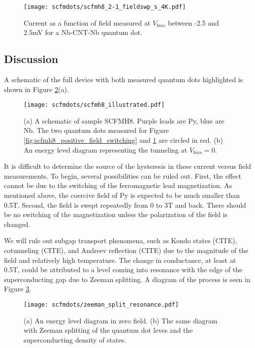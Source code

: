 \begin{figure}
    \centering
    \texttt{[image: scfmdots/scfmh8\_2-1\_fieldswp\_s\_4K.pdf]}
    \caption{Current as a function of field measured at $V_{bias}$ between -2.5 and 2.5mV for a Nb-CNT-Nb quantum dot. }
    \label{fig:scfmh8_all_superconducting}
\end{figure}

\subsection{Discussion}

A schematic of the full device with both measured quantum dots highlighted is shown in Figure \ref{fig:scfmh8_illustration}(a). 

\begin{figure}
    \centering
    \texttt{[image: scfmdots/scfmh8\_illustrated.pdf]}
    \caption{(a) A schematic of sample SCFMH8. Purple leads are Py, blue are Nb. The two quantum dots measured for Figure \ref{fig:scfmh8_positive_field_switching} and \ref{fig:scfmh8_all_superconducting} are circled in red. (b) An energy level diagram representing the tunneling at $V_{bias}=0$.}
    \label{fig:scfmh8_illustration}
\end{figure}

It is difficult to determine the source of the hysteresis in these current versus field measurements. To begin, several possibilities can be ruled out. First, the effect cannot be due to the switching of the ferromagnetic lead magnetization. As mentioned above, the coercive field of Py is expected to be much smaller than 0.5T. Second, the field is swept repeatedly from 0 to 3T and back. There should be no switching of the magnetization unless the polarization of the field is changed.

We will rule out subgap transport phenomena, such as Kondo states (CITE), cotunneling (CITE), and Andreev reflection (CITE) due to the magnitude of the field and relatively high temperature. The change in conductance, at least at 0.5T, could be attributed to a level coming into resonance with the edge of the superconducting gap due to Zeeman splitting. A diagram of the process is seen in Figure \ref{fig:zeeman_split_resonance}.

\begin{figure}
    \centering
    \texttt{[image: scfmdots/zeeman\_split\_resonance.pdf]}
    \caption{(a) An energy level diagram in zero field. (b) The same diagram with Zeeman splitting of the quantum dot leves and the superconducting density of states.}
    \label{fig:zeeman_split_resonance}
\end{figure}

